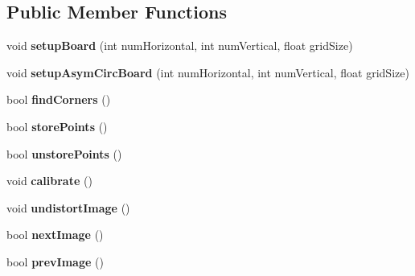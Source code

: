 \subsection*{Public Member Functions}
\begin{DoxyCompactItemize}
\item 
void {\bfseries setup\+Board} (int num\+Horizontal, int num\+Vertical, float grid\+Size)\hypertarget{classcalibrator2d_af7ea8fea2fe2f4dddaabf53eaeb627f0}{}\label{classcalibrator2d_af7ea8fea2fe2f4dddaabf53eaeb627f0}

\item 
void {\bfseries setup\+Asym\+Circ\+Board} (int num\+Horizontal, int num\+Vertical, float grid\+Size)\hypertarget{classcalibrator2d_a054356794a38491ec50d5f00de6921d8}{}\label{classcalibrator2d_a054356794a38491ec50d5f00de6921d8}

\item 
bool {\bfseries find\+Corners} ()\hypertarget{classcalibrator2d_ae21a633c8fdbc9d1d985780100688147}{}\label{classcalibrator2d_ae21a633c8fdbc9d1d985780100688147}

\item 
bool {\bfseries store\+Points} ()\hypertarget{classcalibrator2d_a9c7c8404911a25bca21ea6ee03152528}{}\label{classcalibrator2d_a9c7c8404911a25bca21ea6ee03152528}

\item 
bool {\bfseries unstore\+Points} ()\hypertarget{classcalibrator2d_abe2a5a7eb62731f43f6f8343ab37aa15}{}\label{classcalibrator2d_abe2a5a7eb62731f43f6f8343ab37aa15}

\item 
void {\bfseries calibrate} ()\hypertarget{classcalibrator2d_ac25ed63af6de3722155eda9b0844f977}{}\label{classcalibrator2d_ac25ed63af6de3722155eda9b0844f977}

\item 
void {\bfseries undistort\+Image} ()\hypertarget{classcalibrator2d_a96d83df2b7d366d42bf61547358c9af5}{}\label{classcalibrator2d_a96d83df2b7d366d42bf61547358c9af5}

\item 
bool {\bfseries next\+Image} ()\hypertarget{classcalibrator2d_a2d7e0a23afbc322ca77d628f34ab0613}{}\label{classcalibrator2d_a2d7e0a23afbc322ca77d628f34ab0613}

\item 
bool {\bfseries prev\+Image} ()\hypertarget{classcalibrator2d_af1a3bf827f11c6737b8369eae4789c62}{}\label{classcalibrator2d_af1a3bf827f11c6737b8369eae4789c62}


\end{DoxyCompactItemize}
